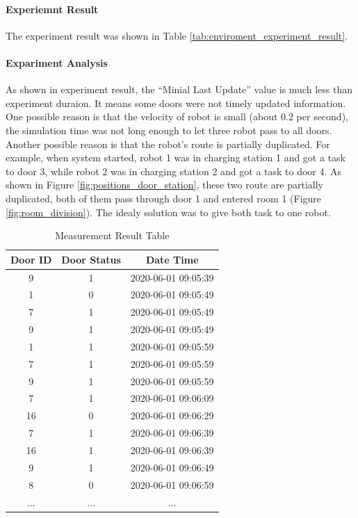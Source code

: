 \paragraph{Experiemnt Result} The experiment result was shown in Table \ref{tab:enviroment_experiment_result}. 

\paragraph{Expariment Analysis} As shown in experiment result, the ``Minial Last Update'' value is much less than experiment duraion. It means some doors were not timely updated information. One possible reason is that the velocity of robot is small (about 0.2 per second), the simulation time was not long enough to let three robot pass to all doors. Another possible reason is that the robot's route is partially duplicated. For example, when system started, robot 1 was in charging station 1 and got a task to door 3, while robot 2 was in charging station 2 and got a task to door 4. As shown in Figure \ref{fig:positions_door_station}, these two route are partially duplicated, both of them pass through door 1 and entered room 1 (Figure \ref{fig:room_division}). The idealy solution was to give both task to one robot. 

\begin{table}[htb]
\centering
\begin{tabular}{|c| c| c|} 
\hline
Door ID & Door Status & Date Time \\
\hline
9 & 1 & 2020-06-01 09:05:39 \\ \hline
1 & 0 & 2020-06-01 09:05:49 \\ \hline
7 & 1 & 2020-06-01 09:05:49 \\ \hline
9 & 1 & 2020-06-01 09:05:49 \\ \hline
1 & 1 & 2020-06-01 09:05:59 \\ \hline
7 & 1 & 2020-06-01 09:05:59 \\ \hline
9 & 1 & 2020-06-01 09:05:59 \\ \hline
7 & 1 & 2020-06-01 09:06:09 \\ \hline
16 & 0 & 2020-06-01 09:06:29 \\ \hline
7 & 1 & 2020-06-01 09:06:39 \\ \hline
16 & 1 & 2020-06-01 09:06:39 \\ \hline
9 & 1 & 2020-06-01 09:06:49 \\ \hline
8 & 0 & 2020-06-01 09:06:59 \\ \hline
... & ...& ... \\ \hline
\end{tabular}
\caption{Measurement Result Table}
\label{tab:db_measurement_result}
\end{table}


